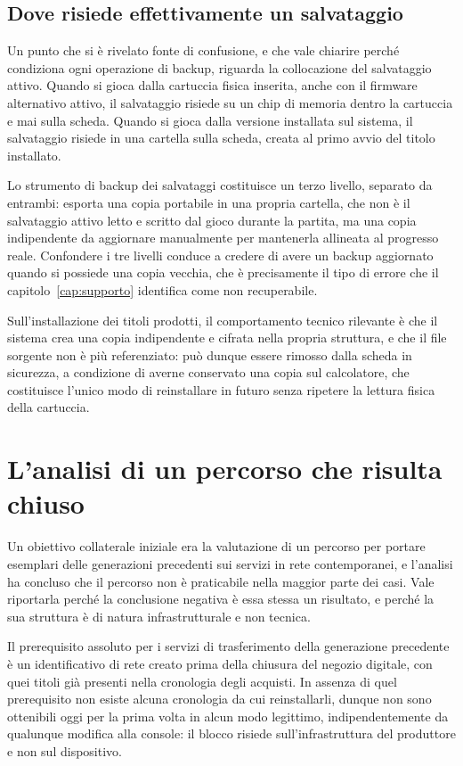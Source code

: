\subsection{Dove risiede effettivamente un salvataggio}

Un punto che si è rivelato fonte di confusione, e che vale chiarire perché condiziona ogni operazione di backup, riguarda la collocazione del salvataggio attivo. Quando si gioca dalla cartuccia fisica inserita, anche con il firmware alternativo attivo, il salvataggio risiede su un chip di memoria dentro la cartuccia e mai sulla scheda. Quando si gioca dalla versione installata sul sistema, il salvataggio risiede in una cartella sulla scheda, creata al primo avvio del titolo installato.

Lo strumento di backup dei salvataggi costituisce un terzo livello, separato da entrambi: esporta una copia portabile in una propria cartella, che non è il salvataggio attivo letto e scritto dal gioco durante la partita, ma una copia indipendente da aggiornare manualmente per mantenerla allineata al progresso reale. Confondere i tre livelli conduce a credere di avere un backup aggiornato quando si possiede una copia vecchia, che è precisamente il tipo di errore che il capitolo~\ref{cap:supporto} identifica come non recuperabile.

Sull'installazione dei titoli prodotti, il comportamento tecnico rilevante è che il sistema crea una copia indipendente e cifrata nella propria struttura, e che il file sorgente non è più referenziato: può dunque essere rimosso dalla scheda in sicurezza, a condizione di averne conservato una copia sul calcolatore, che costituisce l'unico modo di reinstallare in futuro senza ripetere la lettura fisica della cartuccia.

\section{L'analisi di un percorso che risulta chiuso}

Un obiettivo collaterale iniziale era la valutazione di un percorso per portare esemplari delle generazioni precedenti sui servizi in rete contemporanei, e l'analisi ha concluso che il percorso non è praticabile nella maggior parte dei casi. Vale riportarla perché la conclusione negativa è essa stessa un risultato, e perché la sua struttura è di natura infrastrutturale e non tecnica.

Il prerequisito assoluto per i servizi di trasferimento della generazione precedente è un identificativo di rete creato prima della chiusura del negozio digitale, con quei titoli già presenti nella cronologia degli acquisti. In assenza di quel prerequisito non esiste alcuna cronologia da cui reinstallarli, dunque non sono ottenibili oggi per la prima volta in alcun modo legittimo, indipendentemente da qualunque modifica alla console: il blocco risiede sull'infrastruttura del produttore e non sul dispositivo.

